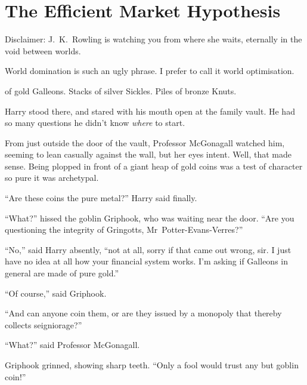 \chapter[The Efficient Market Hypothesis]{The Efficient Market Hypothesis\protect\authorsnotefootnotemark}

\begin{chapterOpeningAuthorNote}
Disclaimer: J.~K.~Rowling is watching you from where she waits, eternally in the void between worlds.
\end{chapterOpeningAuthorNote}
\begin{chapterOpeningQuote}
World domination is such an ugly phrase. I prefer to call it world optimisation.
\end{chapterOpeningQuote}


 of gold Galleons. Stacks of silver Sickles. Piles of bronze Knuts.

\hplettrineextrapara
Harry stood there, and stared with his mouth open at the family vault. He had so many questions he didn’t know \emph{where} to start.

From just outside the door of the vault, Professor McGonagall watched him, seeming to lean casually against the wall, but her eyes intent. Well, that made sense. Being plopped in front of a giant heap of gold coins was a test of character so pure it was archetypal.

“Are these coins the pure metal?” Harry said finally.

“What?” hissed the goblin Griphook, who was waiting near the door. “Are you questioning the integrity of Gringotts, Mr~Potter-Evans-Verres?”

“No,” said Harry absently, “not at all, sorry if that came out wrong, sir. I just have no idea at all how your financial system works. I’m asking if Galleons in general are made of pure gold.”

“Of course,” said Griphook.

“And can anyone coin them, or are they issued by a monopoly that thereby collects seigniorage?”

“What?” said Professor McGonagall.

Griphook grinned, showing sharp teeth. “Only a fool would trust any but goblin coin!”

